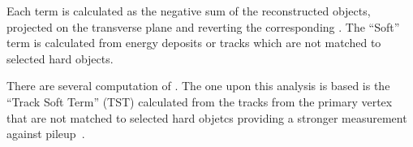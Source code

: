 Each term is calculated as the negative sum of the reconstructed objects, projected on the transverse plane and reverting the corresponding \pt. The ``Soft'' term is calculated from energy deposits or tracks which are not matched to selected hard objects. 

There are several computation of \met. The one upon this analysis is based is the ``Track Soft Term'' (TST) calculated from the tracks from the primary vertex that are not matched to selected hard objetcs providing a stronger measurement against pileup~\cite{Brunt:2013489}.













